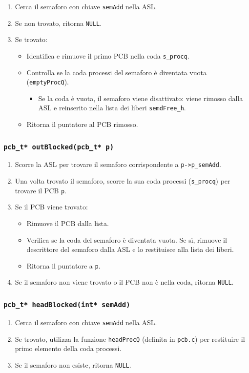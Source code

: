 \documentclass[a4paper,12pt]{article}
\begin{document}
\begin{enumerate}
    \item Cerca il semaforo con chiave \texttt{semAdd} nella ASL.
    \item Se non trovato, ritorna \texttt{NULL}.
    \item Se trovato:
    \begin{itemize}
        \item Identifica e rimuove il primo PCB nella coda \texttt{s\_procq}.
        \item Controlla se la coda processi del semaforo è diventata vuota (\texttt{emptyProcQ}).
        \begin{itemize}
            \item Se la coda è vuota, il semaforo viene disattivato: viene rimosso dalla ASL e reinserito nella lista dei liberi 
        \texttt{semdFree\_h}.
        \end{itemize}
        \item Ritorna il puntatore al PCB rimosso.
    \end{itemize}
\end{enumerate}

\subsubsection{\texttt{pcb\_t* outBlocked(pcb\_t* p)}}


\begin{enumerate}
    \item Scorre la ASL per trovare il semaforo corrispondente a \texttt{p->p\_semAdd}.
    \item Una volta trovato il semaforo, scorre la sua coda processi (\texttt{s\_procq}) per trovare il PCB \texttt{p}.
    \item Se il PCB viene trovato:
    \begin{itemize}
        \item Rimuove il PCB dalla lista.
        \item Verifica se la coda del semaforo è diventata vuota. Se sì, rimuove il descrittore del semaforo dalla ASL e lo restituisce alla lista dei liberi.
        \item Ritorna il puntatore a \texttt{p}.
    \end{itemize}
    \item Se il semaforo non viene trovato o il PCB non è nella coda, ritorna \texttt{NULL}.
\end{enumerate}

\subsubsection{\texttt{pcb\_t* headBlocked(int* semAdd)}}


\begin{enumerate}
    \item Cerca il semaforo con chiave \texttt{semAdd} nella ASL.
    \item Se trovato, utilizza la funzione \texttt{headProcQ} (definita in \texttt{pcb.c}) per restituire il primo elemento della coda processi.
    \item Se il semaforo non esiste, ritorna \texttt{NULL}.
\end{enumerate}
\end{document}
